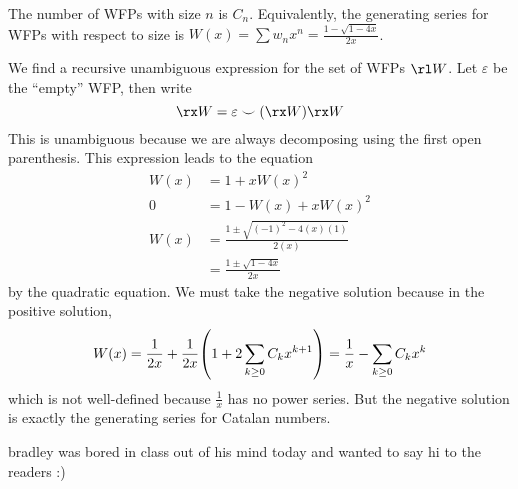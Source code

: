 \begin{theorem}
  The number of WFPs with size $n$ is $C_n$.
  Equivalently, the generating series
  for WFPs with respect to size is
  $W(x) = \sum w_n x^n = \frac{1-\sqrt{1-4x}}{2x}$.
\end{theorem}
\begin{prf}
  We find a recursive unambiguous expression for the set of WFPs $\rl W$.
  Let $\varepsilon$ be the ``empty'' WFP, then write
  \[ \rx W = \varepsilon \smile (\rx W)\rx W \]
  This is unambiguous because we are always decomposing using the first open parenthesis.
  This expression leads to the equation
  \begin{align*}
    W(x) & = 1 + x W(x)^2                               \\
    0    & = 1 - W(x) + x W(x)^2                        \\
    W(x) & = \frac{1 \pm \sqrt{(-1)^2 - 4(x)(1)}}{2(x)} \\
         & = \frac{1 \pm \sqrt{1-4x}}{2x}
  \end{align*}
  by the quadratic equation.
  We must take the negative solution because in the positive solution,
  \[
    W(x) = \frac{1}{2x} + \frac{1}{2x}\qty(1+2\sum_{k\geq 0}C_kx^{k+1})
    = \frac{1}{x} - \sum_{k\geq 0}C_k x^k
  \]
  which is not well-defined because $\frac1x$ has no power series.
  But the negative solution is exactly the generating series for Catalan numbers.
\end{prf}

\begin{theorem}
  bradley was bored in class out of his mind today and wanted to say hi to the readers :)
\end{theorem}

